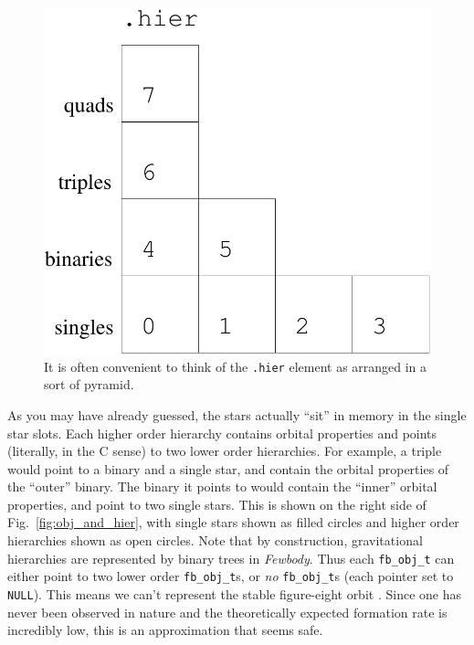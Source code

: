 \documentclass[10pt,preprint]{aastex} %
\newcommand{\Fewbody}{{\em Fewbody\/}}
\begin{document}
\begin{figure}
  \begin{center}
    \includegraphics[scale=0.3]{dot_hier_arranged.pdf}
    \caption{It is often convenient to think of the {\tt .hier} element
      as arranged in a sort of pyramid.\label{fig:dot_hier_arranged}}
  \end{center}
\end{figure}

As you may have already guessed, the stars actually ``sit'' in memory in the single star slots.
Each higher order hierarchy contains orbital properties and points (literally, in the C sense) to 
two lower order hierarchies.  For example, a triple would point to a binary and a single star, and contain
the orbital properties of the ``outer'' binary.  The binary it points to would contain the 
``inner'' orbital properties, and point to two single stars.  This is shown on the right side of
Fig.\ \ref{fig:obj_and_hier}, with single stars shown as filled circles and higher order hierarchies
shown as open circles.  Note that by construction, gravitational hierarchies are represented
by binary trees in \Fewbody.  Thus each {\tt fb\_obj\_t} can either point to two lower order 
{\tt fb\_obj\_t}s, or {\em no} {\tt fb\_obj\_t}s (each pointer set to {\tt NULL}).  
This means we can't represent the stable figure-eight orbit \citep{2000MNRAS.318L..61H}.  Since one has never 
been observed in nature and the theoretically expected formation rate is incredibly low, this 
is an approximation that seems safe.
\end{document}
